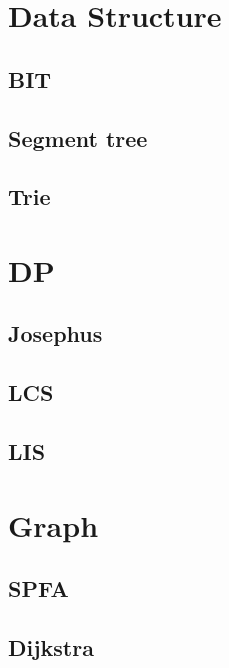 \section{Data Structure}
        \subsection{BIT}
                
        \subsection{Segment tree}
                
        \subsection{Trie}
                

\section{DP} 
        \subsection{Josephus}
                
        \subsection{LCS}
                
        \subsection{LIS}
                  

\section{Graph}
        \subsection{SPFA}
                
        \subsection{Dijkstra}
                
